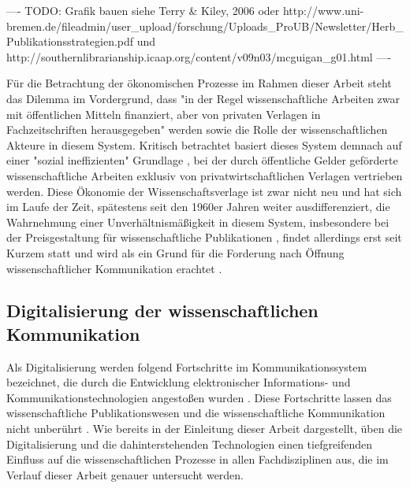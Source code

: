 ---- TODO: Grafik bauen siehe Terry & Kiley, 2006 oder http://www.uni-bremen.de/fileadmin/user_upload/forschung/Uploads_ProUB/Newsletter/Herb_Publikationsstrategien.pdf und http://southernlibrarianship.icaap.org/content/v09n03/mcguigan_g01.html ----

Für die Betrachtung der ökonomischen Prozesse im Rahmen dieser Arbeit steht das Dilemma im Vordergrund, dass "in der Regel wissenschaftliche Arbeiten zwar mit öffentlichen Mitteln finanziert, aber von privaten Verlagen in Fachzeitschriften herausgegeben" \cite[:9]{Cloes_2009} werden sowie die Rolle der wissenschaftlichen Akteure in diesem System. Kritisch betrachtet basiert dieses System demnach auf einer "sozial ineffizienten" Grundlage \cite[:47]{Mueller-Langer_2010}, bei der durch öffentliche Gelder geförderte wissenschaftliche Arbeiten exklusiv von privatwirtschaftlichen Verlagen vertrieben werden. Diese Ökonomie der Wissenschaftsverlage ist zwar nicht neu und hat sich im Laufe der Zeit, spätestens seit den 1960er Jahren weiter ausdifferenziert, die Wahrnehmung einer Unverhältnismäßigkeit in diesem System, insbesondere bei der Preisgestaltung für wissenschaftliche Publikationen \cite{King_2008}, findet allerdings erst seit Kurzem statt \cite{CREATe_2014} und wird als ein Grund für die Forderung nach Öffnung wissenschaftlicher Kommunikation erachtet \cite{Yiotis_2013} \cite{Herb_2010}.

\subsection{Digitalisierung der wissenschaftlichen Kommunikation}

Als Digitalisierung werden folgend Fortschritte im Kommunikationssystem bezeichnet, die durch die Entwicklung elektronischer Informations- und Kommunikationstechnologien angestoßen wurden \cite{BBAW_2015}. Diese Fortschritte lassen das wissenschaftliche Publikationswesen und die wissenschaftliche Kommunikation nicht unberührt \cite{Naeder_2010}. Wie bereits in der Einleitung dieser Arbeit dargestellt, üben die Digitalisierung und die dahinterstehenden Technologien einen tiefgreifenden Einfluss auf die wissenschaftlichen Prozesse in allen Fachdisziplinen aus, die im Verlauf dieser Arbeit genauer untersucht werden.

